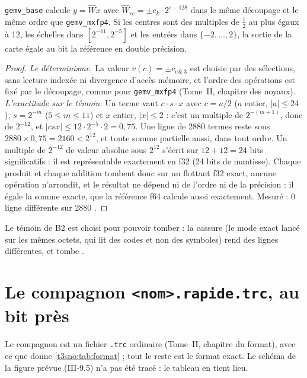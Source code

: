 \begin{proposition}\label{t3sno:prop:b2}
\texttt{gemv\_base} calcule $y = \hat W x$ avec $\hat W_{rc} = \pm c_{k} \cdot 2^{e - 128}$ dans le même découpage et le même ordre que \texttt{gemv\_mxfp4}. Si les centres sont des multiples de $\frac12$ au plus égaux à 12, les échelles dans $[2^{-11}, 2^{-5}]$ et les entrées dans $\{-2, \dots, 2\}$, la sortie de la carte égale au bit la référence en double précision.
\end{proposition}
\begin{proof}
\emph{Le déterminisme.} La valeur $v(c) = \pm c_{c \,\&\, 3}$ est choisie par des sélections, sans lecture indexée ni divergence d'accès mémoire, et l'ordre des opérations est fixé par le découpage, comme pour \texttt{gemv\_mxfp4} (Tome~II, chapitre des noyaux).
\emph{L'exactitude sur le témoin.} Un terme vaut $c \cdot s \cdot x$ avec $c = a/2$ ($a$ entier, $\lvert a \rvert \le 24$), $s = 2^{-m}$ ($5 \le m \le 11$) et $x$ entier, $\lvert x \rvert \le 2$ : c'est un multiple de $2^{-(m+1)}$, donc de $2^{-12}$, et $\lvert c s x\rvert \le 12 \cdot 2^{-5} \cdot 2 = 0{,}75$. Une ligne de \num{2880} termes reste sous $\num{2880} \times 0{,}75 = \num{2160} < 2^{12}$, et toute somme partielle aussi, dans tout ordre. Un multiple de $2^{-12}$ de valeur absolue sous $2^{12}$ s'écrit sur $12 + 12 = 24$ bits significatifs : il est représentable exactement en f32 (24 bits de mantisse). Chaque produit et chaque addition tombent donc sur un flottant f32 exact, aucune opération n'arrondit, et le résultat ne dépend ni de l'ordre ni de la précision : il égale la somme exacte, que la référence f64 calcule aussi exactement. Mesuré : 0 ligne différente sur \num{2880} \mes.
\end{proof}

Le témoin de B2 est choisi pour pouvoir tomber : la cassure (le mode exact lancé sur les mêmes octets, qui lit des codes et non des symboles) rend des lignes différentes, et tombe \mes.

\section{Le compagnon \texttt{<nom>.rapide.trc}, au bit près}\label{t3sno:sec:format}

Le compagnon est un fichier \texttt{.trc} ordinaire (Tome~II, chapitre du format), avec ce que donne \cref{t3sno:tab:format} ; tout le reste est le format exact. Le schéma de la figure prévue (III-9.5) n'a pas été tracé : le tableau en tient lieu.


